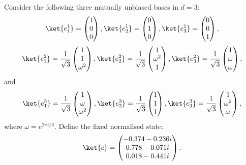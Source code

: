 Consider the following three mutually unbiased bases in $d=3$:
\[
\ket{e^1_1}=
\begin{pmatrix}
1 \\
0 \\
0
\end{pmatrix}
,
\ket{e^1_2}=
\begin{pmatrix}
0 \\
1\\
0
\end{pmatrix}
,
\ket{e^1_3}=
\begin{pmatrix}
0 \\
0\\
1
\end{pmatrix},
\]
\[
\ket{e^2_1}=
\frac{1}{\sqrt{3}}
\begin{pmatrix}
1 \\
1 \\
\omega^2
\end{pmatrix}
,
\ket{e^2_2}=
\frac{1}{\sqrt{3}}
\begin{pmatrix}
1 \\
\omega^2\\
1
\end{pmatrix}
,
\ket{e^2_3}=
\frac{1}{\sqrt{3}}
\begin{pmatrix}
1 \\
\omega\\
\omega
\end{pmatrix},
\]
and
\[
\ket{e^3_1}=
\frac{1}{\sqrt{3}}
\begin{pmatrix}
1 \\
\omega\\
\omega^2
\end{pmatrix}
,
\ket{e^3_2}=
\frac{1}{\sqrt{3}}
\begin{pmatrix}
1 \\
1\\
1
\end{pmatrix}
,
\ket{e^3_3}=
\frac{1}{\sqrt{3}}
\begin{pmatrix}
1 \\
\omega^2\\
\omega
\end{pmatrix},
\]
where $\omega=e^{2\pi i/3}$.
Define the fixed normalised state:
\[
\ket{c}=
\begin{pmatrix}
 -0.374-0.236 i \\
 0.778-0.071 i \\
 0.018-0.441 i \\
\end{pmatrix}.
\]

